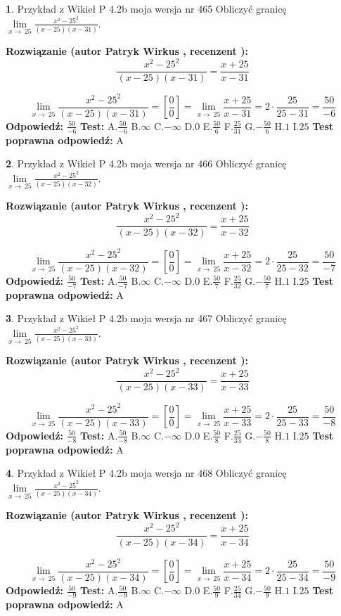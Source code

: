 \documentclass[12pt, a4paper]{article}
\theoremstyle{definition} %
\newtheorem{zad}{}
\newcommand{\zadStart}[1]{\begin{zad}#1\newline}
\newcommand{\zadStop}{\end{zad}}
\newcommand{\rozwStart}[2]{\noindent \textbf{Rozwiązanie (autor #1 , recenzent #2): }\newline}
\newcommand{\rozwStop}{\newline}
\newcommand{\odpStart}{\noindent \textbf{Odpowiedź:}\newline}
\newcommand{\odpStop}{\newline}
\newcommand{\testStart}{\noindent \textbf{Test:}\newline}
\newcommand{\testStop}{\newline}
\newcommand{\kluczStart}{\noindent \textbf{Test poprawna odpowiedź:}\newline}
\newcommand{\kluczStop}{\newline}
\begin{document}
\zadStart{Przykład z Wikieł P 4.2b moja wersja nr 465}
Obliczyć granicę $\lim\limits_{x\to\ 25}\frac{x^{2}-25^{2}}{(x-25)(x-31)}$.
\zadStop
\rozwStart{Patryk Wirkus}{}
$$\frac{x^{2}-25^{2}}{(x-25)(x-31)}=\frac{x+25}{x-31}$$

$$\lim\limits_{x\to\ 25}\frac{x^{2}-25^{2}}{(x-25)(x-31)}=[\frac{0}{0}]=\lim\limits_{x\to\ 25}\frac{x+25}{x-31}=2 \cdot \frac{25}{25-31} = \frac{50}{-6}$$
\rozwStop
\odpStart
$\frac{50}{-6}$
\odpStop
\testStart
A.$\frac{50}{-6}$
B.$\infty$
C.$-\infty$
D.$0$
E.$\frac{50}{6}$
F.$\frac{25}{31}$
G.$-\frac{50}{6}$
H.$1$
I.$25$
\testStop
\kluczStart
A
\kluczStop



\zadStart{Przykład z Wikieł P 4.2b moja wersja nr 466}
Obliczyć granicę $\lim\limits_{x\to\ 25}\frac{x^{2}-25^{2}}{(x-25)(x-32)}$.
\zadStop
\rozwStart{Patryk Wirkus}{}
$$\frac{x^{2}-25^{2}}{(x-25)(x-32)}=\frac{x+25}{x-32}$$

$$\lim\limits_{x\to\ 25}\frac{x^{2}-25^{2}}{(x-25)(x-32)}=[\frac{0}{0}]=\lim\limits_{x\to\ 25}\frac{x+25}{x-32}=2 \cdot \frac{25}{25-32} = \frac{50}{-7}$$
\rozwStop
\odpStart
$\frac{50}{-7}$
\odpStop
\testStart
A.$\frac{50}{-7}$
B.$\infty$
C.$-\infty$
D.$0$
E.$\frac{50}{7}$
F.$\frac{25}{32}$
G.$-\frac{50}{7}$
H.$1$
I.$25$
\testStop
\kluczStart
A
\kluczStop



\zadStart{Przykład z Wikieł P 4.2b moja wersja nr 467}
Obliczyć granicę $\lim\limits_{x\to\ 25}\frac{x^{2}-25^{2}}{(x-25)(x-33)}$.
\zadStop
\rozwStart{Patryk Wirkus}{}
$$\frac{x^{2}-25^{2}}{(x-25)(x-33)}=\frac{x+25}{x-33}$$

$$\lim\limits_{x\to\ 25}\frac{x^{2}-25^{2}}{(x-25)(x-33)}=[\frac{0}{0}]=\lim\limits_{x\to\ 25}\frac{x+25}{x-33}=2 \cdot \frac{25}{25-33} = \frac{50}{-8}$$
\rozwStop
\odpStart
$\frac{50}{-8}$
\odpStop
\testStart
A.$\frac{50}{-8}$
B.$\infty$
C.$-\infty$
D.$0$
E.$\frac{50}{8}$
F.$\frac{25}{33}$
G.$-\frac{50}{8}$
H.$1$
I.$25$
\testStop
\kluczStart
A
\kluczStop



\zadStart{Przykład z Wikieł P 4.2b moja wersja nr 468}
Obliczyć granicę $\lim\limits_{x\to\ 25}\frac{x^{2}-25^{2}}{(x-25)(x-34)}$.
\zadStop
\rozwStart{Patryk Wirkus}{}
$$\frac{x^{2}-25^{2}}{(x-25)(x-34)}=\frac{x+25}{x-34}$$

$$\lim\limits_{x\to\ 25}\frac{x^{2}-25^{2}}{(x-25)(x-34)}=[\frac{0}{0}]=\lim\limits_{x\to\ 25}\frac{x+25}{x-34}=2 \cdot \frac{25}{25-34} = \frac{50}{-9}$$
\rozwStop
\odpStart
$\frac{50}{-9}$
\odpStop
\testStart
A.$\frac{50}{-9}$
B.$\infty$
C.$-\infty$
D.$0$
E.$\frac{50}{9}$
F.$\frac{25}{34}$
G.$-\frac{50}{9}$
H.$1$
I.$25$
\testStop
\kluczStart
A
\kluczStop
\end{document}
